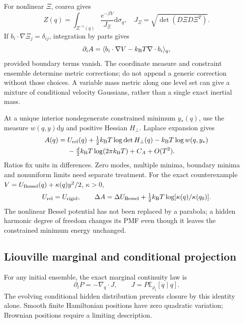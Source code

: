 \documentclass[11pt]{article}
\newcommand{\kb}{k_{\rm B}}
\newcommand{\dd}{\mathrm d}
\newcommand{\E}{\mathbb E}
\begin{document}
For nonlinear $\Xi$, coarea gives
\begin{equation}
Z(q)=\int_{\Xi^{-1}(q)}\frac{e^{-\beta V}}{J_\Xi}\dd\sigma_q,
\quad J_\Xi=\sqrt{\det(D\Xi D\Xi^T)}.
\end{equation}
If $b_i\cdot\nabla\Xi_j=\delta_{ij}$, integration by parts gives
\begin{equation}
\partial_iA=\langle b_i\cdot\nabla V-\kb T\nabla\cdot b_i\rangle_q,
\end{equation}
provided boundary terms vanish. The coordinate measure and constraint
ensemble determine metric corrections; do not append a generic correction
without those choices\cite{Legoll2010}. A variable mass metric along one
level set can give a mixture of conditional velocity Gaussians, rather
than a single exact inertial mass.

At a unique interior nondegenerate constrained minimum $y_*(q)$, use the
measure $w(q,y)\dd y$ and positive Hessian $H_\perp$. Laplace expansion gives
\begin{align}
A(q)={}&U_{\rm rel}(q)+\tfrac12\kb T\log\det H_\perp(q)
 -\kb T\log w(q,y_*)\nonumber\\
 &-\tfrac d2\kb T\log(2\pi\kb T)+C_A+O(T^2).
\end{align}
Ratios fix units in differences. Zero modes, multiple minima, boundary
minima and nonuniform limits need separate treatment. For the exact
counterexample $V=U_{\rm Bessel}(q)+\kappa(q)y^2/2$, $\kappa>0$,
\begin{equation}
U_{\rm rel}=U_{\rm rigid},\qquad
\Delta A=\Delta U_{\rm Bessel}+\tfrac12\kb T\log[\kappa(q)/\kappa(q_0)].
\end{equation}
The nonlinear Bessel potential has not been replaced by a parabola; a hidden
harmonic degree of freedom changes its PMF even though it leaves the
constrained minimum energy unchanged.

\subsection{Liouville marginal and conditional projection}
For any initial ensemble, the exact marginal continuity law is
\begin{equation}
\partial_tP=-\nabla_q\cdot J,\qquad J=P\E_{\rho_t}[\dot q\mid q].
\end{equation}
The evolving conditional hidden distribution prevents closure by this
identity alone. Smooth finite Hamiltonian positions have zero quadratic
variation; Brownian positions require a limiting description.
\end{document}
